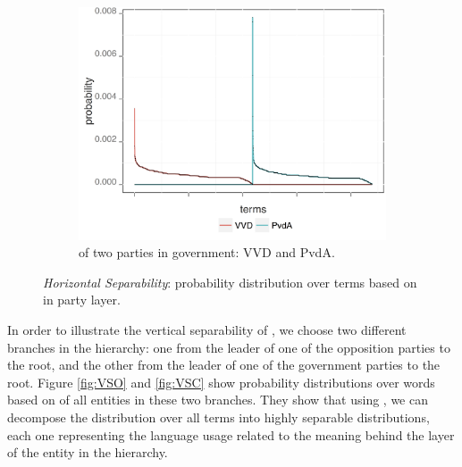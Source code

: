 \begin{figure}[!t]
        ~ 
        \begin{subfigure}[b]{0.32\textwidth}
\centering
\includegraphics[width=\linewidth]{02-part-01/chapter-03/figs_and_tables/img_VVD-PvdA.png}
\caption{\label{fig:HSPCC} \achswlm of two parties in government: VVD and PvdA.}
        \end{subfigure}
        \caption{\label{fig:HSP-pairs} \emph{Horizontal Separability}: probability distribution over terms based on \hswlms in party layer.}
\end{figure}

In order to illustrate the vertical separability of \achswlm, we choose two different branches in the hierarchy: one from the leader of one of the opposition parties to the root, and the other from the leader of one of the government parties to the root. Figure \ref{fig:VSO} and \ref{fig:VSC} show probability distributions over words based on \achswlm of all entities in these two branches. They show that using \achswlm, we can decompose the distribution over all terms into  highly separable distributions, each one representing the language usage related to the meaning behind the layer of the entity in the hierarchy. 

